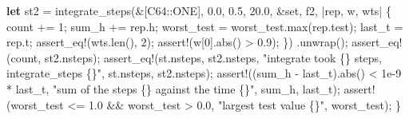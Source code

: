\documentclass[
  10pt,
]{article}
\newenvironment{Shaded}{}{}
\newcommand{\DecValTok}[1]{\textcolor[rgb]{0.25,0.63,0.44}{#1}}
\newcommand{\KeywordTok}[1]{\textcolor[rgb]{0.00,0.44,0.13}{\textbf{#1}}}
\newcommand{\NormalTok}[1]{#1}
\newcommand{\OperatorTok}[1]{\textcolor[rgb]{0.40,0.40,0.40}{#1}}
\newcommand{\PreprocessorTok}[1]{\textcolor[rgb]{0.74,0.48,0.00}{#1}}
\newcommand{\StringTok}[1]{\textcolor[rgb]{0.25,0.44,0.63}{#1}}
\begin{document}
\begin{Shaded}
\begin{Highlighting}[]
        \KeywordTok{let}\NormalTok{ st2 }\OperatorTok{=}\NormalTok{ integrate\_steps(}\OperatorTok{\&}\NormalTok{[}\PreprocessorTok{C64::}\NormalTok{ONE]}\OperatorTok{,} \DecValTok{0.0}\OperatorTok{,} \DecValTok{0.5}\OperatorTok{,} \DecValTok{20.0}\OperatorTok{,} \OperatorTok{\&}\NormalTok{set}\OperatorTok{,}\NormalTok{ f2}\OperatorTok{,} \OperatorTok{|}\NormalTok{rep}\OperatorTok{,}\NormalTok{ w}\OperatorTok{,}\NormalTok{ wts}\OperatorTok{|} \OperatorTok{\{}
\NormalTok{            count }\OperatorTok{+=} \DecValTok{1}\OperatorTok{;}
\NormalTok{            sum\_h }\OperatorTok{+=}\NormalTok{ rep}\OperatorTok{.}\NormalTok{h}\OperatorTok{;}
\NormalTok{            worst\_test }\OperatorTok{=}\NormalTok{ worst\_test}\OperatorTok{.}\NormalTok{max(rep}\OperatorTok{.}\NormalTok{test)}\OperatorTok{;}
\NormalTok{            last\_t }\OperatorTok{=}\NormalTok{ rep}\OperatorTok{.}\NormalTok{t}\OperatorTok{;}
            \PreprocessorTok{assert\_eq!}\NormalTok{(wts}\OperatorTok{.}\NormalTok{len()}\OperatorTok{,} \DecValTok{2}\NormalTok{)}\OperatorTok{;}
            \PreprocessorTok{assert!}\NormalTok{(w[}\DecValTok{0}\NormalTok{]}\OperatorTok{.}\NormalTok{abs() }\OperatorTok{\textgreater{}} \DecValTok{0.9}\NormalTok{)}\OperatorTok{;}
        \OperatorTok{\}}\NormalTok{)}
        \OperatorTok{.}\NormalTok{unwrap()}\OperatorTok{;}
        \PreprocessorTok{assert\_eq!}\NormalTok{(count}\OperatorTok{,}\NormalTok{ st2}\OperatorTok{.}\NormalTok{nsteps)}\OperatorTok{;}
        \PreprocessorTok{assert\_eq!}\NormalTok{(st}\OperatorTok{.}\NormalTok{nsteps}\OperatorTok{,}\NormalTok{ st2}\OperatorTok{.}\NormalTok{nsteps}\OperatorTok{,} \StringTok{"integrate took \{\} steps, integrate\_steps \{\}"}\OperatorTok{,}\NormalTok{ st}\OperatorTok{.}\NormalTok{nsteps}\OperatorTok{,}\NormalTok{ st2}\OperatorTok{.}\NormalTok{nsteps)}\OperatorTok{;}
        \PreprocessorTok{assert!}\NormalTok{((sum\_h }\OperatorTok{{-}}\NormalTok{ last\_t)}\OperatorTok{.}\NormalTok{abs() }\OperatorTok{\textless{}} \DecValTok{1e{-}9} \OperatorTok{*}\NormalTok{ last\_t}\OperatorTok{,} \StringTok{"sum of the steps \{\} against the time \{\}"}\OperatorTok{,}\NormalTok{ sum\_h}\OperatorTok{,}\NormalTok{ last\_t)}\OperatorTok{;}
        \PreprocessorTok{assert!}\NormalTok{(worst\_test }\OperatorTok{\textless{}=} \DecValTok{1.0} \OperatorTok{\&\&}\NormalTok{ worst\_test }\OperatorTok{\textgreater{}} \DecValTok{0.0}\OperatorTok{,} \StringTok{"largest test value \{\}"}\OperatorTok{,}\NormalTok{ worst\_test)}\OperatorTok{;}
    \OperatorTok{\}}


\end{Highlighting}
\end{Shaded}
\end{document}
